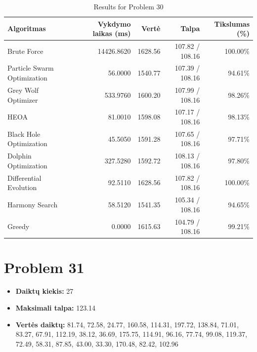 \documentclass[a4paper,11pt]{article}
\begin{document}
\begin{table}[h!]
\centering
\begin{tabular}{lrrrr}
\toprule
\textbf{Algoritmas} & \textbf{Vykdymo laikas (ms)} & \textbf{Vertė} & \textbf{Talpa} & \textbf{Tikslumas (\%)} \\
\midrule
Brute Force & 14426.8620 & 1628.56 & 107.82 / 108.16 & 100.00\% \\
Particle Swarm Optimization & 56.0000 & 1540.77 & 107.39 / 108.16 & 94.61\% \\
Grey Wolf Optimizer & 533.9760 & 1600.20 & 107.99 / 108.16 & 98.26\% \\
HEOA & 81.0010 & 1598.08 & 107.17 / 108.16 & 98.13\% \\
Black Hole Optimization & 45.5050 & 1591.28 & 107.65 / 108.16 & 97.71\% \\
Dolphin Optimization & 327.5280 & 1592.72 & 108.13 / 108.16 & 97.80\% \\
Differential Evolution & 92.5110 & 1628.56 & 107.82 / 108.16 & 100.00\% \\
Harmony Search & 58.5120 & 1541.35 & 105.34 / 108.16 & 94.65\% \\
Greedy & 0.0000 & 1615.63 & 104.79 / 108.16 & 99.21\% \\
\bottomrule
\end{tabular}
\caption{Results for Problem 30}
\end{table}
\clearpage

\section*{Problem 31}
\begin{itemize}
    \item \textbf{Daiktų kiekis:} 27
    \item \textbf{Maksimali talpa:} 123.14
    \item \textbf{Vertės daiktų:} 81.74, 72.58, 24.77, 160.58, 114.31, 197.72, 138.84, 71.01, 83.27, 67.91, 112.19, 38.12, 36.69, 175.75, 114.91, 96.16, 77.74, 99.08, 119.37, 72.49, 58.31, 87.85, 43.00, 33.30, 170.48, 82.42, 102.96
\end{itemize}
\end{document}
